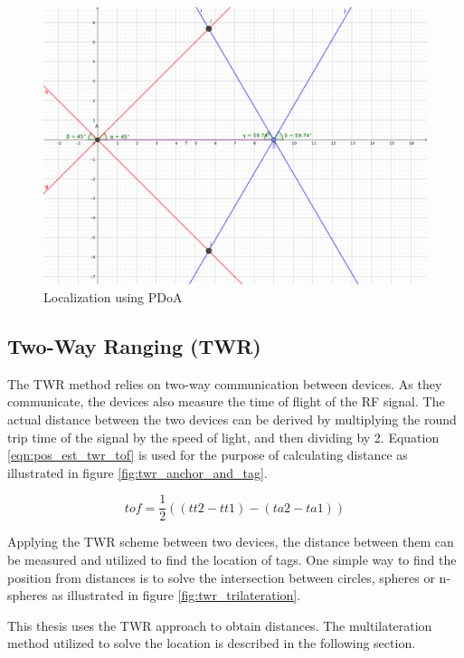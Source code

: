 \documentclass[\main/main.tex]{subfiles}
\begin{document}
\begin{figure}[H]
    \centering
    \includegraphics[width=1\textwidth]{pdoa.png}
    \caption{Localization using PDoA}
    \label{fig:pdoa}
\end{figure}

\subsection{Two-Way Ranging (TWR)}
The TWR method relies on two-way communication between devices. As they communicate, the devices also measure the time of flight of the RF signal. The actual distance between the two devices can be derived by multiplying the round trip time of the signal by the speed of light, and then dividing by 2. Equation \ref{eqn:pos_est_twr_tof} is used for the purpose of calculating distance as illustrated in figure \ref{fig:twr_anchor_and_tag}.

\begin{equation}
    tof = \frac{1}{2} ((tt2 - tt1) - (ta2 - ta1))
    \label{eqn:pos_est_twr_tof}
\end{equation}

Applying the TWR scheme between two devices, the distance between them can be measured and utilized to find the location of tags. One simple way to find the position from distances is to solve the intersection between circles, spheres or n-spheres as illustrated in figure \ref{fig:twr_trilateration}.

This thesis uses the TWR approach to obtain distances. The multilateration method utilized to solve the location is described in the following section.
\end{document}
